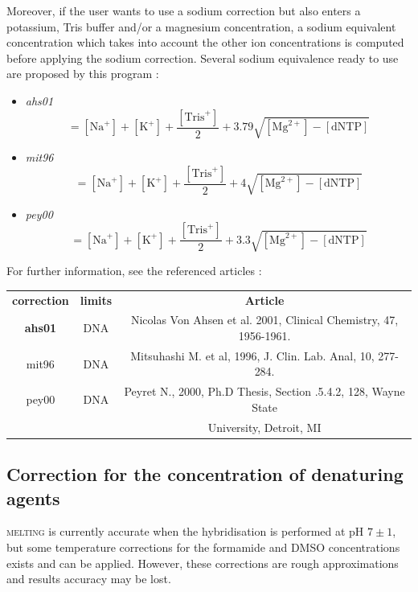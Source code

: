 \documentclass{article}
\begin{document}
Moreover, if the user wants to use a sodium correction but also enters a potassium, Tris buffer
and/or a magnesium concentration, a sodium equivalent concentration which takes into account the other
ion concentrations is computed before applying the sodium correction.
Several sodium equivalence ready to use are proposed by this program :
\begin{itemize}
\item \textit{ahs01}
 \begin{displaymath}
 [\mbox{NaEq}^+]=[\mbox{Na}^+]+[\mbox{K}^+]+\frac{[\mbox{Tris}^+]}{2}+3.79 \sqrt{[\mbox{Mg}^{2+}] - [\mbox{dNTP}]}
 \end{displaymath}
 \item \textit{mit96}
 \begin{displaymath}
 [\mbox{NaEq}^+]=[\mbox{Na}^+]+[\mbox{K}^+]+\frac{[\mbox{Tris}^+]}{2}+4 \sqrt{[\mbox{Mg}^{2+}] - [\mbox{dNTP}]}
 \end{displaymath}
 \item \textit{pey00}
 \begin{displaymath}
 [\mbox{NaEq}^+]=[\mbox{Na}^+]+[\mbox{K}^+]+\frac{[\mbox{Tris}^+]}{2}+3.3 \sqrt{[\mbox{Mg}^{2+}] - [\mbox{dNTP}]}
 \end{displaymath}
\end{itemize}

For further information, see the referenced articles :
\begin{table}[h]
\begin{tabular}[h]{| c | c | c |}
\textbf{correction} & \textbf{limits} & \textbf{Article} \\ 
\textbf{ahs01} & DNA & Nicolas Von Ahsen et al. 2001, Clinical Chemistry, 47, 1956-1961. \\
mit96 & DNA & Mitsuhashi M. et al, 1996, J. Clin. Lab. Anal, 10, 277-284.\\
pey00 & DNA & Peyret N., 2000, Ph.D Thesis, Section .5.4.2, 128, Wayne State \\
 & & University, Detroit, MI\\
\end{tabular}
\end{table}

\subsection{Correction for the concentration of denaturing agents}  

\textsc{melting} is currently accurate when the hybridisation is performed at pH $7\pm 1$,  
but some temperature corrections for the formamide and DMSO concentrations exists and can be
applied. However, these corrections are rough approximations and results accuracy may be lost.
\end{document}
